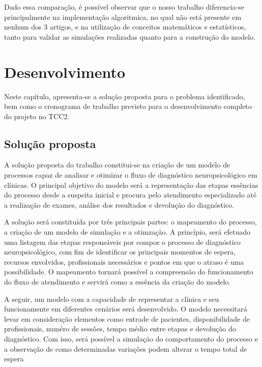 \documentclass[
    12pt,                %
    openright,           %
    oneside,             %
    a4paper,             %
    english,             %
    brazil               %
]{abntex2}
\begin{document}
Dado essa comparação, é possível observar que o nosso trabalho diferencia-se principalmente na implementação algoritmica, no qual não está presente em nenhum dos 3 artigos, e na utilização de conceitos matemáticos e estatísticos, tanto para validar as simulações realizadas quanto para a construção do modelo.

\chapter{Desenvolvimento}
\label{cap:desenvolvimento}

Neste capítulo, apresenta-se a solução proposta para o problema identificado, bem como o cronograma de trabalho previsto para o desenvolvimento completo do projeto no TCC2.

\section{Solução proposta}
\label{sec:solucao}

A solução proposta do trabalho constitui-se na criação de um modelo de processos capaz de analisar e otimizar o fluxo de diagnóstico neuropsicológico em clínicas. O principal objetivo do modelo será a representação das etapas essências do processo desde a suspeita inicial e procura pelo atendimento especializado até a realização de exames, análise dos resultados e devolução do diagnóstico. 

A solução será constituída por três principais partes: o mapeamento do processo, a criação de um modelo de simulação e a otimzação. A princípio, será efetuado uma listagem das etapas responsáveis por compor o processo de diagnóstico neuropsicológico, com fim de identificar os principais momentos de espera, recursos envolvidos, profissionais necessários e pontos em que o atraso é uma possibilidade. O mapeamento tornará possível a compreensão do funcionamento do fluxo de atendimento e servirá como a essência da criação do modelo.

A seguir, um modelo com a capacidade de representar a clínica e seu funcionamente em diferentes cenários será desenvolvido. O modelo necessitará levar em consideração elementos como entrade de pacientes, disponibilidade de profissionais, numéro de sessões, tempo médio entre etapas e devolução do diagnóstico. Com isso, será possível a simulação do comportamento do processo e a observação de como determinadas variações podem alterar o tempo total de espera
\end{document}
